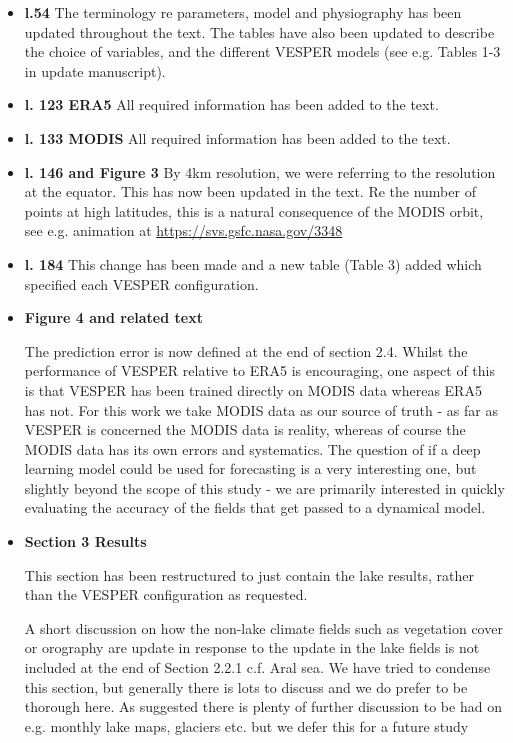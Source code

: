 \documentclass[10pt]{article}
\begin{document}
\begin{itemize}
	\item \textbf{l.54} The terminology re parameters, model and physiography has been updated throughout the text. The tables have also been updated to describe the choice of variables, and the different VESPER models  (see e.g. Tables 1-3 in update manuscript). 
	\item \textbf{l. 123 ERA5} All required information has been added to the text. 
	\item \textbf{l. 133 MODIS} All required information has been added to the text. 
	\item \textbf{l. 146 and Figure 3} By 4km resolution, we were referring to the resolution at the equator. This has now been updated in the text. Re the number of points at high latitudes, this is a natural consequence of the MODIS orbit, see e.g. animation at \url{https://svs.gsfc.nasa.gov/3348}
	\item \textbf{l. 184} This change has been made and a new table (Table 3) added which specified each VESPER configuration.
	\item \textbf{Figure 4 and related text} 
	
	The prediction error is now defined at the end of section 2.4. Whilst the performance of VESPER relative to ERA5 is encouraging, one aspect of this is that VESPER has been trained directly on MODIS data whereas ERA5 has not. For this work we take MODIS data as our source of truth - as far as VESPER is concerned the MODIS data is reality, whereas of course the MODIS data has its own errors and systematics. The question of if a deep learning model could be used for forecasting is a very interesting one, but slightly beyond the scope of this study - we are primarily interested in quickly evaluating the accuracy of the fields that get passed to a dynamical model.
	\item \textbf{Section 3 Results} 
	
	This section has been restructured to just contain the lake results, rather than the VESPER configuration as requested. 
	
	A short discussion on how the  non-lake climate fields such as vegetation cover or orography are update in response to the update in the lake fields is not included at the end of Section 2.2.1 c.f. Aral sea. We have tried to condense this section, but generally there is lots to discuss and we do prefer to be thorough here. As suggested there is plenty of further discussion to be had on e.g. monthly lake maps, glaciers etc. but we defer this for a future study
	

\end{itemize}
\end{document}
